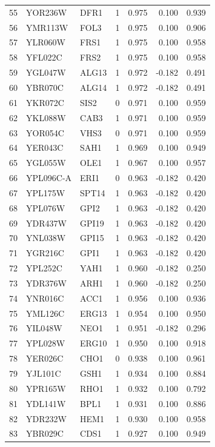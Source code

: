 \begin{longtable}{rllrrrr}
55 & YOR236W & DFR1 & 1 & 0.975 & 0.100 & 0.939\\
56 & YMR113W & FOL3 & 1 & 0.975 & 0.100 & 0.906\\
57 & YLR060W & FRS1 & 1 & 0.975 & 0.100 & 0.958\\
58 & YFL022C & FRS2 & 1 & 0.975 & 0.100 & 0.958\\
59 & YGL047W & ALG13 & 1 & 0.972 & -0.182 & 0.491\\
60 & YBR070C & ALG14 & 1 & 0.972 & -0.182 & 0.491\\
61 & YKR072C & SIS2 & 0 & 0.971 & 0.100 & 0.959\\
62 & YKL088W & CAB3 & 1 & 0.971 & 0.100 & 0.959\\
63 & YOR054C & VHS3 & 0 & 0.971 & 0.100 & 0.959\\
64 & YER043C & SAH1 & 1 & 0.969 & 0.100 & 0.949\\
65 & YGL055W & OLE1 & 1 & 0.967 & 0.100 & 0.957\\
66 & YPL096C-A & ERI1 & 0 & 0.963 & -0.182 & 0.420\\
67 & YPL175W & SPT14 & 1 & 0.963 & -0.182 & 0.420\\
68 & YPL076W & GPI2 & 1 & 0.963 & -0.182 & 0.420\\
69 & YDR437W & GPI19 & 1 & 0.963 & -0.182 & 0.420\\
70 & YNL038W & GPI15 & 1 & 0.963 & -0.182 & 0.420\\
71 & YGR216C & GPI1 & 1 & 0.963 & -0.182 & 0.420\\
72 & YPL252C & YAH1 & 1 & 0.960 & -0.182 & 0.250\\
73 & YDR376W & ARH1 & 1 & 0.960 & -0.182 & 0.250\\
74 & YNR016C & ACC1 & 1 & 0.956 & 0.100 & 0.936\\
75 & YML126C & ERG13 & 1 & 0.954 & 0.100 & 0.950\\
76 & YIL048W & NEO1 & 1 & 0.951 & -0.182 & 0.296\\
77 & YPL028W & ERG10 & 1 & 0.950 & 0.100 & 0.918\\
78 & YER026C & CHO1 & 0 & 0.938 & 0.100 & 0.961\\
79 & YJL101C & GSH1 & 1 & 0.934 & 0.100 & 0.884\\
80 & YPR165W & RHO1 & 1 & 0.932 & 0.100 & 0.792\\
81 & YDL141W & BPL1 & 1 & 0.931 & 0.100 & 0.886\\
82 & YDR232W & HEM1 & 1 & 0.930 & 0.100 & 0.958\\
83 & YBR029C & CDS1 & 1 & 0.927 & 0.100 & 0.949\\

\end{longtable}
